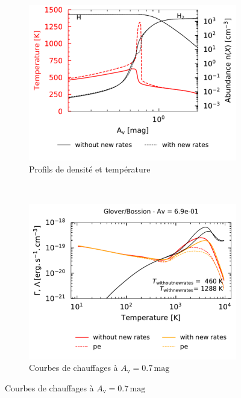 \begin{figure}[!h]
    \centering
    \begin{subfigure}[t]{0.49\textwidth} %
        \centering \includegraphics[trim = {0 0 0 0cm },clip,width=1\textwidth]{figure/H2/pic/profilT.pdf}
        \caption{Profils de densité et température}
        \label{fig:H2:Bossion:profilT}
    \end{subfigure}
    ~ 
    \begin{subfigure}[t]{0.49\textwidth}
        \centering \includegraphics[trim = {0 0 0 1cm },clip,width=1\textwidth]{figure/H2/pic/GCcomp_h_6p9em01.pdf}
        \caption{Courbes de chauffages à $A_\mathrm{v}=0.7\,\mathrm{mag}$}
         \label{fig:H2:Bossion:zer}

\end{subfigure}
\end{figure}
